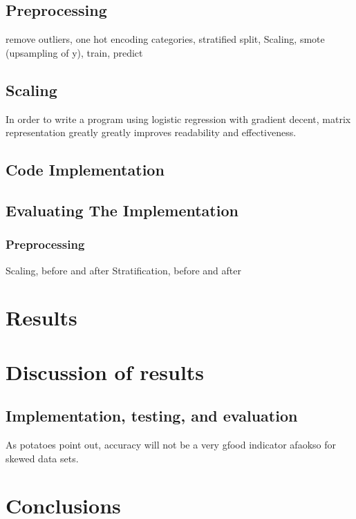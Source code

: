 \documentclass[%
oneside,                 %
final,                   %
10pt]{article}
\begin{document}
\subsection{Preprocessing}
remove outliers,  one hot encoding categories, stratified split, Scaling, smote (upsampling of y), train, predict
\subsection{Scaling} \label{Section_M_Scaling}
 \label{Section_M_Matrixrep}
In order to write a program using logistic regression with gradient decent, matrix representation greatly greatly improves readability and effectiveness. 



\subsection{Code Implementation} \label{Section_M_Codeimpl}
\subsection{Evaluating The Implementation} \label{Section_M_eval}

\subsubsection{Preprocessing}
Scaling, before and after
Stratification, before and after
\section{Results} \label{Section_Results}
\section{Discussion of results} \label{Section_Discussion_of_results}
\subsection{Implementation, testing, and evaluation}
As potatoes point out, accuracy will not be a very gfood indicator afaokso for skewed data sets.
\section{Conclusions} \label{Section_Conclusions}






\begin{appendices}

\end{appendices}
\end{document}
